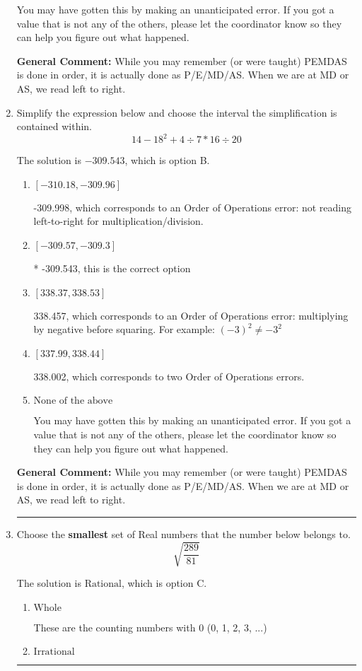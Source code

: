 \documentclass{extbook}[14pt]
\newcommand{\litem}[1]{\item #1

\rule{\textwidth}{0.4pt}}
\begin{document}
\begin{enumerate}
{\begin{enumerate}[label=\Alph*.]
 You may have gotten this by making an unanticipated error. If you got a value that is not any of the others, please let the coordinator know so they can help you figure out what happened.
\end{enumerate}

\textbf{General Comment:} While you may remember (or were taught) PEMDAS is done in order, it is actually done as P/E/MD/AS. When we are at MD or AS, we read left to right.
}
\litem{
Simplify the expression below and choose the interval the simplification is contained within.
\[ 14 - 18^2 + 4 \div 7 * 16 \div 20 \]

The solution is \( -309.543 \), which is option B.\begin{enumerate}[label=\Alph*.]
\item \( [-310.18, -309.96] \)

 -309.998, which corresponds to an Order of Operations error: not reading left-to-right for multiplication/division.
\item \( [-309.57, -309.3] \)

* -309.543, this is the correct option
\item \( [338.37, 338.53] \)

 338.457, which corresponds to an Order of Operations error: multiplying by negative before squaring. For example: $(-3)^2 \neq -3^2$
\item \( [337.99, 338.44] \)

 338.002, which corresponds to two Order of Operations errors.
\item \( \text{None of the above} \)

 You may have gotten this by making an unanticipated error. If you got a value that is not any of the others, please let the coordinator know so they can help you figure out what happened.
\end{enumerate}

\textbf{General Comment:} While you may remember (or were taught) PEMDAS is done in order, it is actually done as P/E/MD/AS. When we are at MD or AS, we read left to right.
}
\litem{
Choose the \textbf{smallest} set of Real numbers that the number below belongs to.
\[ \sqrt{\frac{289}{81}} \]

The solution is \( \text{Rational} \), which is option C.\begin{enumerate}[label=\Alph*.]
\item \( \text{Whole} \)

These are the counting numbers with 0 (0, 1, 2, 3, ...)
\item \( \text{Irrational} \)


\end{enumerate}}
\end{enumerate}
\end{document}
